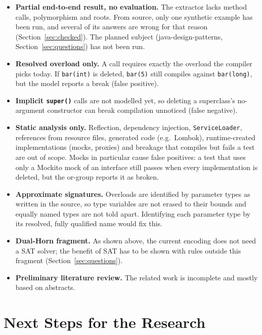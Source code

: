 \documentclass[11pt,a4paper]{article}
\newcommand{\code}[1]{\texttt{#1}}
\begin{document}
\begin{itemize}
  \item \textbf{Partial end-to-end result, no evaluation.} The extractor
        lacks method calls, polymorphism and roots. From source, only one
        synthetic example has been run, and several of its answers are wrong
        for that reason (Section~\ref{sec:checked}). The planned subject
        (java-design-patterns, Section~\ref{sec:questions}) has not been
        run.
  \item \textbf{Resolved overload only.} A call requires exactly the
        overload the compiler picks today. If \code{bar(int)} is deleted,
        \code{bar(5)} still compiles against \code{bar(long)}, but the model
        reports a break (false positive).
  \item \textbf{Implicit \code{super()}} calls are not modelled yet, so
        deleting a superclass's no-argument constructor can break
        compilation unnoticed (false negative).
  \item \textbf{Static analysis only.} Reflection, dependency injection,
        \code{ServiceLoader}, references from resource files, generated code
        (e.g.\ Lombok), runtime-created implementations (mocks, proxies) and
        breakage that compiles but fails a test are out of scope. Mocks in
        particular cause false positives: a test that uses only a Mockito
        mock of an interface still passes when every implementation is
        deleted, but the or-group reports it as broken.
  \item \textbf{Approximate signatures.} Overloads are identified by
        parameter types as written in the source, so type variables are not
        erased to their bounds and equally named types are not told apart.
        Identifying each parameter type by its resolved, fully qualified
        name would fix this.
  \item \textbf{Dual-Horn fragment.} As shown above, the current encoding
        does not need a SAT solver; the benefit of SAT has to be shown with
        rules outside this fragment (Section~\ref{sec:questions}).
  \item \textbf{Preliminary literature review.} The related work is
        incomplete and mostly based on abstracts.
\end{itemize}

\section{Next Steps for the Research}
\end{document}

